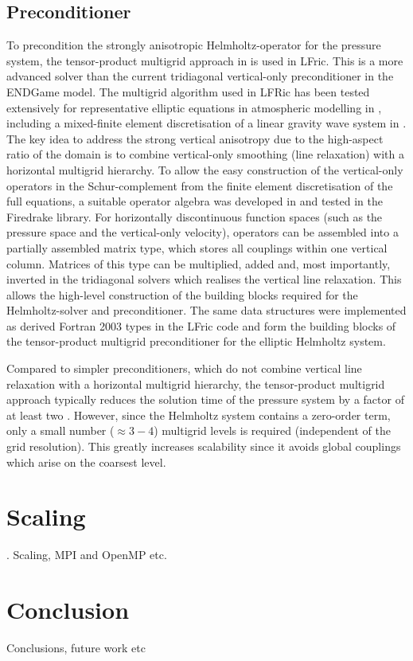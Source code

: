 \documentclass[times]{elsarticle}
\begin{document}
\subsection{\label{sec:preconditioner}Preconditioner}
To precondition the strongly anisotropic Helmholtz-operator for the pressure system, the tensor-product multigrid approach in \cite{Borm2001} is used in LFric. This is a more advanced solver than the current tridiagonal vertical-only preconditioner in the ENDGame model. The multigrid algorithm used in LFRic has been tested extensively for representative elliptic equations in atmospheric modelling in \cite{Mueller2014,Dedner2016}, including a mixed-finite element discretisation of a linear gravity wave system in \cite{Mitchell2016}. The key idea to address the strong vertical anisotropy due to the high-aspect ratio of the domain is to combine vertical-only smoothing (line relaxation) with a horizontal multigrid hierarchy. To allow the easy construction of the vertical-only operators in the Schur-complement from the finite element discretisation of the full equations, a suitable operator algebra was developed in \cite{Mitchell2016} and tested in the Firedrake library. For horizontally discontinuous function spaces (such as the pressure space and the vertical-only velocity), operators can be assembled into a partially assembled matrix type, which stores all couplings within one vertical column. Matrices of this type can be multiplied, added and, most importantly, inverted in the tridiagonal solvers which realises the vertical line relaxation. This allows the high-level construction of the building blocks required for the Helmholtz-solver and preconditioner. The same data structures were implemented as derived Fortran 2003 types in the LFric code and form the building blocks of the tensor-product multigrid preconditioner for the elliptic Helmholtz system.

Compared to simpler preconditioners, which do not combine vertical line relaxation with a horizontal multigrid hierarchy, the tensor-product multigrid approach typically reduces the solution time of the pressure system by a factor of at least two \cite{Mueller2014,Mitchell2016}. However, since the Helmholtz system contains a zero-order term, only a small number ($\approx 3-4$) multigrid levels is required (independent of the grid resolution). This greatly increases scalability since it avoids global couplings which arise on the coarsest level.
\section{\label{sec:scal}Scaling}.
Scaling, MPI and OpenMP etc.

\section{Conclusion}
\label{sec:con}
Conclusions, future work etc



\end{document}
